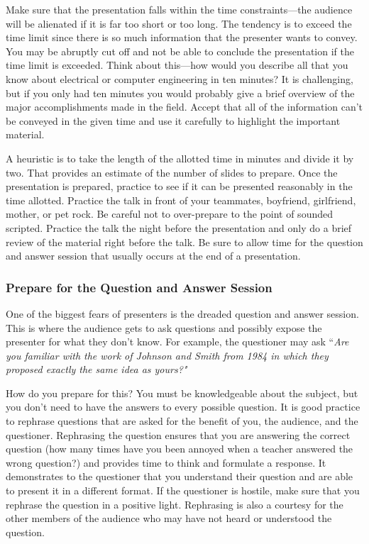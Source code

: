 Make sure that the presentation falls within the time constraints---the
audience will be alienated if it is far too short or too long. The
tendency is to exceed the time limit since there is so much information
that the presenter wants to convey. You may be abruptly cut off and not
be able to conclude the presentation if the time limit is exceeded.
Think about this---how would you describe all that you know about
electrical or computer engineering in ten minutes? It is challenging,
but if you only had ten minutes you would probably give a brief overview
of the major accomplishments made in the field. Accept that all of the
information can't be conveyed in the given time and use it carefully to
highlight the important material.

A heuristic is to take the length of the allotted time in minutes and
divide it by two. That provides an estimate of the number of slides to
prepare. Once the presentation is prepared, practice to see if it can be
presented reasonably in the time allotted. Practice the talk in front of
your teammates, boyfriend, girlfriend, mother, or pet rock. Be careful
not to over-prepare to the point of sounded scripted. Practice the talk
the night before the presentation and only do a brief review of the
material right before the talk. Be sure to allow time for the question
and answer session that usually occurs at the end of a presentation.

\subsubsection*{Prepare for the Question and Answer
Session}\label{prepare-for-the-question-and-answer-session}

One of the biggest fears of presenters is the dreaded question and
answer session. This is where the audience gets to ask questions and
possibly expose the presenter for what they don't know. For example, the
questioner may ask ``\emph{Are you familiar with the work of Johnson and
Smith from 1984 in which they proposed exactly the same idea as yours?"}

How do you prepare for this? You must be knowledgeable about the
subject, but you don't need to have the answers to every possible
question. It is good practice to rephrase questions that are asked for
the benefit of you, the audience, and the questioner. Rephrasing the
question ensures that you are answering the correct question (how many
times have you been annoyed when a teacher answered the wrong question?)
and provides time to think and formulate a response. It demonstrates to
the questioner that you understand their question and are able to
present it in a different format. If the questioner is hostile, make
sure that you rephrase the question in a positive light. Rephrasing is
also a courtesy for the other members of the audience who may have not
heard or understood the question.

